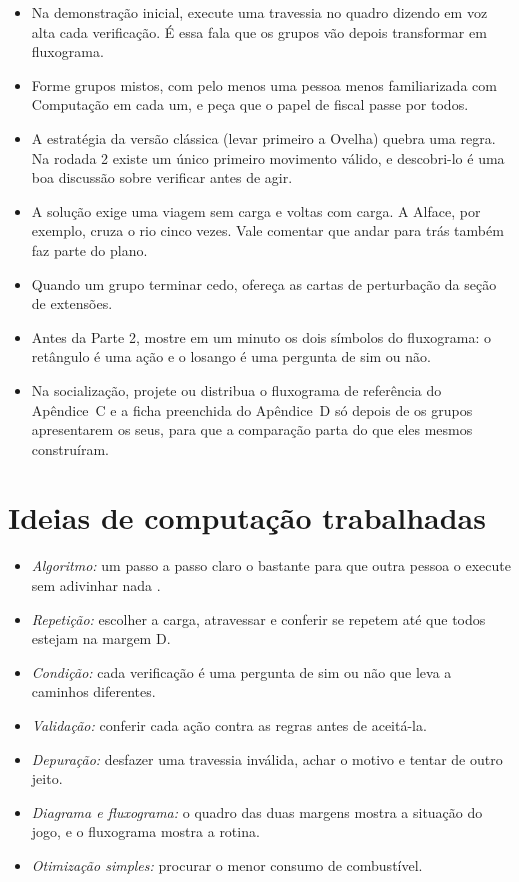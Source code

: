 \documentclass[12pt,a4paper]{article}
\begin{document}
\begin{itemize}
  \item Na demonstração inicial, execute uma travessia no quadro dizendo em voz
        alta cada verificação. É essa fala que os grupos vão depois transformar
        em fluxograma.
  \item Forme grupos mistos, com pelo menos uma pessoa menos familiarizada com
        Computação em cada um, e peça que o papel de fiscal passe por todos.
  \item A estratégia da versão clássica (levar primeiro a Ovelha) quebra uma
        regra. Na rodada 2 existe um único primeiro movimento válido, e descobri-lo
        é uma boa discussão sobre verificar antes de agir.
  \item A solução exige uma viagem sem carga e voltas com carga. A Alface, por
        exemplo, cruza o rio cinco vezes. Vale comentar que andar para trás
        também faz parte do plano.
  \item Quando um grupo terminar cedo, ofereça as cartas de perturbação da
        seção de extensões.
  \item Antes da Parte 2, mostre em um minuto os dois símbolos do fluxograma: o
        retângulo é uma ação e o losango é uma pergunta de sim ou não.
  \item Na socialização, projete ou distribua o fluxograma de referência do
        Apêndice~C e a ficha preenchida do Apêndice~D só depois de os grupos
        apresentarem os seus, para que a comparação parta do que eles mesmos
        construíram.
\end{itemize}

\section{Ideias de computação trabalhadas}

\begin{itemize}
  \item \textit{Algoritmo:} um passo a passo claro o bastante para que outra
        pessoa o execute sem adivinhar nada \cite{wing2006}.
  \item \textit{Repetição:} escolher a carga, atravessar e conferir se repetem
        até que todos estejam na margem D.
  \item \textit{Condição:} cada verificação é uma pergunta de sim ou não que
        leva a caminhos diferentes.
  \item \textit{Validação:} conferir cada ação contra as regras antes de
        aceitá-la.
  \item \textit{Depuração:} desfazer uma travessia inválida, achar o motivo e
        tentar de outro jeito.
  \item \textit{Diagrama e fluxograma:} o quadro das duas margens mostra a
        situação do jogo, e o fluxograma mostra a rotina.
  \item \textit{Otimização simples:} procurar o menor consumo de combustível.
\end{itemize}
\end{document}
